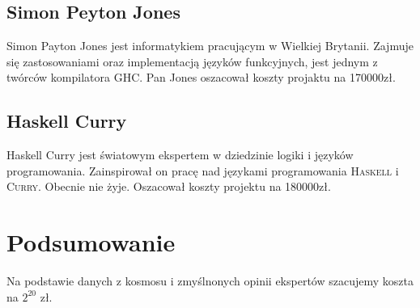 \documentclass{documentation}
\begin{document}
\subsection{Simon Peyton Jones}
Simon Payton Jones jest informatykiem pracującym w Wielkiej Brytanii. Zajmuje się zastosowaniami
oraz implementacją języków funkcyjnych, jest jednym z twórców kompilatora \textsc{GHC}.
Pan Jones oszacował koszty projaktu na 170000zł.

\subsection{Haskell Curry}
Haskell Curry jest światowym ekspertem w dziedzinie logiki i języków programowania.
Zainspirował on pracę nad językami programowania \textsc{Haskell} i \textsc{Curry}.
Obecnie nie żyje. Oszacował koszty projektu na 180000zł.

\section{Podsumowanie}
Na podstawie danych z kosmosu i zmyślnonych opinii ekspertów szacujemy koszta na
$2^{20}$ zł.
\end{document}
